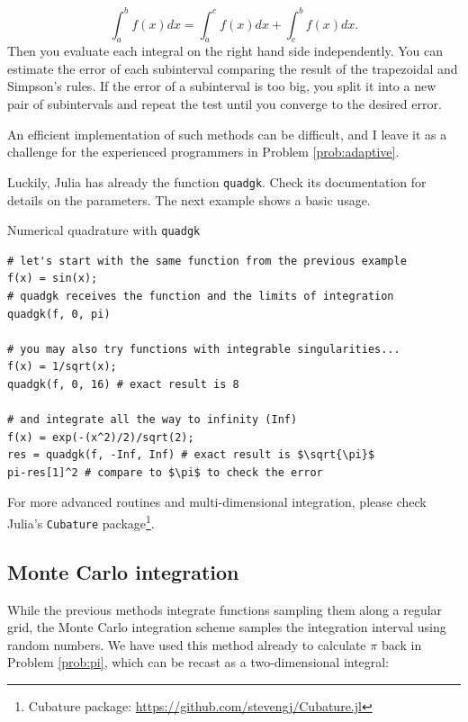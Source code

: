 \begin{equation}
 \int_a^b f(x) dx = \int_a^c f(x) dx + \int_c^b f(x) dx.
\end{equation}
Then you evaluate each integral on the right hand side independently. You can estimate the error of each subinterval comparing the result of the  trapezoidal and Simpson's rules. If the error of a subinterval is too big, you split it into a new pair of subintervals and repeat the test until you converge to the desired error.

An efficient implementation of such methods can be difficult, and I leave it as a challenge for the experienced programmers in Problem \ref{prob:adaptive}.

Luckily, Julia has already the function \texttt{quadgk}. Check its documentation for details on the parameters. The next example shows a basic usage.

\begin{example}{Numerical quadrature with \texttt{quadgk}}
\label{ex:quadgk}
\begin{verbatim}
# let's start with the same function from the previous example
f(x) = sin(x);
# quadgk receives the function and the limits of integration
quadgk(f, 0, pi)

# you may also try functions with integrable singularities...
f(x) = 1/sqrt(x);
quadgk(f, 0, 16) # exact result is 8

# and integrate all the way to infinity (Inf)
f(x) = exp(-(x^2)/2)/sqrt(2);
res = quadgk(f, -Inf, Inf) # exact result is $\sqrt{\pi}$
pi-res[1]^2 # compare to $\pi$ to check the error
\end{verbatim}
\end{example}

For more advanced routines and multi-dimensional integration, please check Julia's \texttt{Cubature} package\footnote{Cubature package: \url{https://github.com/stevengj/Cubature.jl}}.

\subsection{Monte Carlo integration}

While the previous methods integrate functions sampling them along a regular grid, the Monte Carlo integration scheme samples the integration interval using random numbers. We have used this method already to calculate $\pi$ back in Problem \ref{prob:pi}, which can be recast as a two-dimensional integral:

